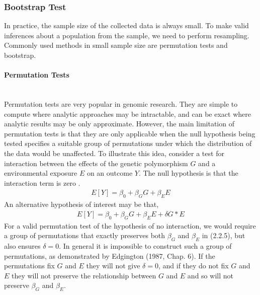 \documentclass[11pt]{article}
\begin{document}
\subsubsection{{Bootstrap Test}}
In practice, the sample size of the collected data is always small. To make valid inferences about a population from the sample, we need to perform resampling. Commonly used methods in small sample size are permutation tests and bootstrap.\\
\paragraph{Permutation Tests}\mbox{}\\
Permutation tests are very popular in genomic research. They are simple to compute where analytic approaches may be intractable, and can be exact where analytic results may be only approximate. However, the main limitation of permutation tests is that they are only applicable when the null hypothesis being tested specifies a suitable group of permutations under which the distribution of the data would be unaffected. To illustrate this idea, consider a test for interaction between the effects of the genetic polymorphism $G$ and a environmental exposure $E$ on an outcome $Y$. The null hypothesis is that the interaction term is zero \citep{buzkova_permutation_2011}.
\begin{align}
E[Y]=\beta_0+\beta_GG+\beta_EE
\end{align}
An alternative hypothesis of interest may be that,
\begin{align*}
E[Y]=\beta_0+\beta_GG+\beta_EE+\delta G*E
\end{align*}
For a valid permutation test of the hypothesis of no interaction, we would require a group of permutations that exactly preserves both $\beta_G$ and $\beta_E$ in (2.2.5), but also ensures $\delta=0$. In general it is impossible to construct such a group of permutations, as demonstrated by Edgington (1987, Chap. 6). If the permutations fix $G$ and $E$ they will not give $\delta=0$, and if they do not fix $G$ and $E$ they will not preserve the relationship between $G$ and $E$ and so will not preserve $\beta_G$ and $\beta_E$.
\end{document}
